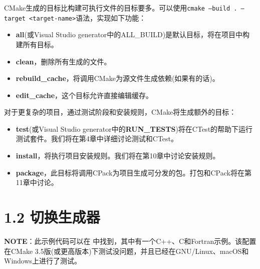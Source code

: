 
CMake生成的目标比构建可执行文件的目标要多。可以使用\texttt{cmake --build . --target <target-name>}语法，实现如下功能：

\begin{itemize}
\item \textbf{all}(或Visual Studio generator中的ALL\_BUILD)是默认目标，将在项目中构建所有目标。

\item \textbf{clean}，删除所有生成的文件。

\item \textbf{rebuild\_cache}，将调用CMake为源文件生成依赖(如果有的话)。

\item \textbf{edit\_cache}，这个目标允许直接编辑缓存。

\end{itemize}

对于更复杂的项目，通过测试阶段和安装规则，CMake将生成额外的目标：

\begin{itemize}
\item \textbf{test}(或Visual Studio generator中的\textbf{RUN\_TESTS})将在CTest的帮助下运行测试套件。我们将在第4章中详细讨论测试和CTest。

\item \textbf{install}，将执行项目安装规则。我们将在第10章中讨论安装规则。

\item \textbf{package}，此目标将调用CPack为项目生成可分发的包。打包和CPack将在第11章中讨论。

\end{itemize}


\section{1.2 切换生成器}

\begin{myInfoBox}
\textbf{NOTE}：此示例代码可以在  中找到，其中有一个C++、C和Fortran示例。该配置在CMake 3.5版(或更高版本)下测试没问题，并且已经在GNU/Linux、macOS和Windows上进行了测试。
\end{myInfoBox}

